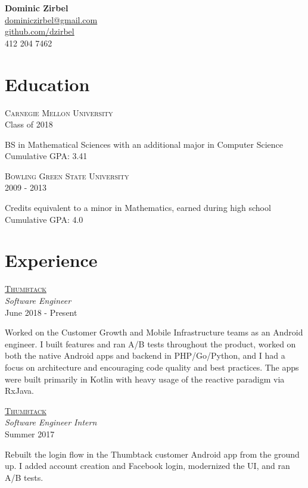 \documentclass[letterpaper,10pt]{article}
\newcommand{\lb}{\vspace{4pt} \\}
\newenvironment{resumecols2}[2]
{
    \vspace{.1cm}
    \begin{minipage}[t]{.21\linewidth}
        \begin{flushright}
            \textsc{#1} \\
            \small{#2}
        \end{flushright}
    \end{minipage}
    \hspace{.005\linewidth}
    \begin{minipage}[t]{.77\linewidth}
}
{
    \end{minipage}
    \vspace{.1cm}
}
\newenvironment{resumecols}[4]
{
    \vspace{.1cm}
    \begin{minipage}[t]{.21\linewidth}
        \begin{flushright}
            \href{#2}{\textsc{#1}} \\
            \small{\textit{#3}} \\
            \small{#4}
        \end{flushright}
    \end{minipage}
    \hspace{.005\linewidth}
    \begin{minipage}[t]{.77\linewidth}
}
{
    \end{minipage}
    \vspace{.1cm}
}
\begin{document}
\thispagestyle{empty}

\begin{flushright}
    \textbf{\Large{Dominic Zirbel}} \\
    \href{mailto:dominiczirbel@gmail.com}{dominiczirbel@gmail.com} \\
    \href{https://github.com/dzirbel}{github.com/dzirbel} \\
    412 204 7462
\end{flushright}

\section{Education}

\begin{resumecols2}{Carnegie Mellon University}{Class of 2018}
    BS in Mathematical Sciences with an additional major in Computer Science
    \lb
    Cumulative GPA: 3.41
\end{resumecols2}

\begin{resumecols2}{Bowling Green State University}{2009 - 2013}
    Credits equivalent to a minor in Mathematics, earned during high school
    \lb
    Cumulative GPA: 4.0
\end{resumecols2}

\section{Experience}

\begin{resumecols}{Thumbtack}{https://www.thumbtack.com/about}{Software Engineer}{June 2018 - Present}
    Worked on the Customer Growth and Mobile Infrastructure teams as an Android engineer. I built features and ran A/B tests throughout the product, worked on both the native Android apps and backend in PHP/Go/Python, and I had a focus on architecture and encouraging code quality and best practices. The apps were built primarily in Kotlin with heavy usage of the reactive paradigm via RxJava.
\end{resumecols}

\begin{resumecols}{Thumbtack}{https://www.thumbtack.com/about}{Software Engineer Intern}{Summer 2017}
    Rebuilt the login flow in the Thumbtack customer Android app from the ground up. I added account creation and Facebook login, modernized the UI, and ran A/B tests.
\end{resumecols}
\end{document}
